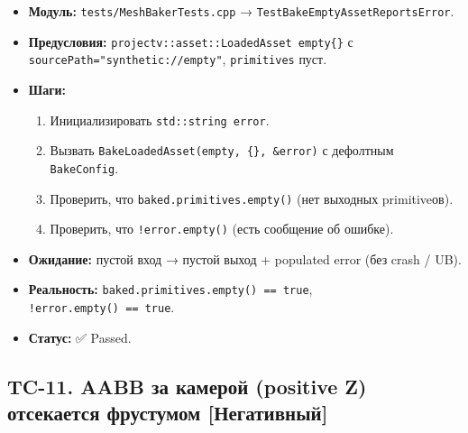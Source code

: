 \documentclass[
  11pt,a4paper,oneside]{article}
\providecommand{\tightlist}{%
  \setlength{\itemsep}{0pt}\setlength{\parskip}{0pt}}
\providecommand{\tightlist}{%
  \setlength{\itemsep}{0pt}\setlength{\parskip}{0pt}}
\begin{document}
\begin{itemize}
\tightlist
\item
  \textbf{Модуль:} \texttt{tests/MeshBakerTests.cpp} → \texttt{TestBakeEmptyAssetReportsError}.
\item
  \textbf{Предусловия:} \texttt{projectv::asset::LoadedAsset\ empty\{\}} с \texttt{sourcePath="synthetic://empty"}, \texttt{primitives} пуст.
\item
  \textbf{Шаги:}

  \begin{enumerate}
  \def\labelenumi{\arabic{enumi}.}
  \tightlist
  \item
    Инициализировать \texttt{std::string\ error}.
  \item
    Вызвать \texttt{BakeLoadedAsset(empty,\ \{\},\ \&error)} с дефолтным \texttt{BakeConfig}.
  \item
    Проверить, что \texttt{baked.primitives.empty()} (нет выходных primitive\textquotesingle ов).
  \item
    Проверить, что \texttt{!error.empty()} (есть сообщение об ошибке).
  \end{enumerate}
\item
  \textbf{Ожидание:} пустой вход → пустой выход + populated error (без crash / UB).
\item
  \textbf{Реальность:} \texttt{baked.primitives.empty()\ ==\ true}, \texttt{!error.empty()\ ==\ true}.
\item
  \textbf{Статус:} ✅ Passed.
\end{itemize}

\subsection{TC-11. AABB за камерой (positive Z) отсекается фрустумом {[}Негативный{]}}\label{tc-11-aabb-ux437ux430-ux43aux430ux43cux435ux440ux43eux439-positive-z-ux43eux442ux441ux435ux43aux430ux435ux442ux441ux44f-ux444ux440ux443ux441ux442ux443ux43cux43eux43c-ux43dux435ux433ux430ux442ux438ux432ux43dux44bux439}
\end{document}
